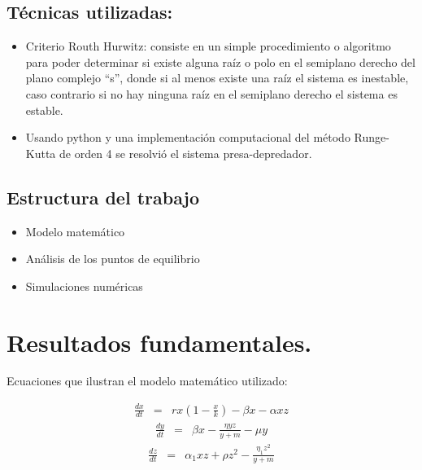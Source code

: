 \documentclass{wscpaperproc}
\theoremstyle{wsc}
\begin{document}
\subsection*{Técnicas utilizadas:}
\begin{itemize}
	\item Criterio Routh Hurwitz: consiste en un simple procedimiento o algoritmo para poder determinar si existe alguna raíz o polo en el semiplano derecho del
	      plano complejo “s”, donde si al menos existe una raíz el sistema es inestable, caso contrario si no hay ninguna raíz en el semiplano derecho el sistema es estable.
	\item Usando python y una implementación computacional del método Runge-Kutta de orden 4 se resolvió el sistema presa-depredador.
\end{itemize}
\subsection{Estructura del trabajo}
\begin{itemize}
	\item Modelo matemático
	\item Análisis de los puntos de equilibrio
	\item Simulaciones numéricas
\end{itemize}

\section{Resultados fundamentales.}


Ecuaciones que ilustran el modelo matemático utilizado:

\begin{eqnarray}\label{dx}
	\frac{dx}{dt} &=& rx(1-\frac{x}{k})-\beta x-\alpha xz
\end{eqnarray}
\begin{eqnarray}\label{dy}
	\frac{dy}{dt} &=& \beta x-\frac{\eta yz}{y+m}-\mu y
\end{eqnarray}
\begin{eqnarray}\label{dz}
	\frac{dz}{dt} &=& \alpha_1 xz+\rho z^2-\frac{\eta_1z^2}{y+m}
\end{eqnarray}



\vspace*{1cm}
\end{document}
